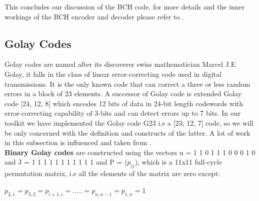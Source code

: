 This concludes our discussion of the BCH code, for more details and the inner workings of the BCH encoder and decoder please refer to \cite{66}.

\subsection{Golay Codes}
\label{golay_related}
Golay codes are named after its discoverer swiss mathematician Marcel J.E Golay, it falls in the class of linear error-correcting code used in digital transmissions. It is the only known code that can correct a three or less random errors in a block of 23 elements. A successor of Golay code is extended Golay code [24, 12, 8] which encodes 12 bits of data in 24-bit length codewords with error-correcting capability of 3-bits and can detect errors up to 7 bits. In our toolkit we have implemented
the Golay code G23 i.e a [23, 12, 7] code, so we will be only concerned with the definition and constructs of the latter. A lot of work in this subsection is influenced and taken from \cite{golay}.\\

\textbf{Binary Golay codes} are constructed using the vectors u = 1 1 0 1 1 1 0 0 0 1 0 and J = 1 1 1 1 1 1 1 1 1 1 1 and P = ($p_{ij}$), which is a 11x11 full-cycle permutation matrix, i.e all the elements of the matrix are zero except:

\tab \tab \tab $p_{2,1} = p_{3,2} = p_{i+1,i} = . . . . . = p_{n,n-1} = p_{1,n} = 1$

